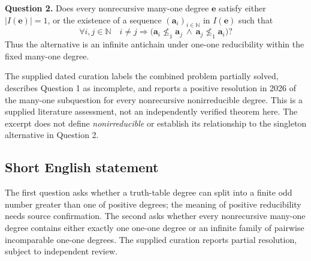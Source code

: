 \documentclass[11pt]{article}
\newcommand{\N}{\mathbb{N}}
\begin{document}
\textbf{Question 2.} Does every nonrecursive many-one degree \(\mathbf e\) satisfy either \(|I(\mathbf e)|=1\), or the existence of a sequence \((\mathbf a_i)_{i\in\N}\) in \(I(\mathbf e)\) such that
\[
\forall i,j\in\N\quad
 i\ne j\Longrightarrow
 \bigl(\mathbf a_i\not\leq_1\mathbf a_j\ \land\ \mathbf a_j\not\leq_1\mathbf a_i\bigr)?
\]
Thus the alternative is an infinite antichain under one-one reducibility within the fixed many-one degree.

The supplied dated curation labels the combined problem partially solved, describes Question 1 as incomplete, and reports a positive resolution in 2026 of the many-one subquestion for every nonrecursive nonirreducible degree. This is a supplied literature assessment, not an independently verified theorem here. The excerpt does not define \emph{nonirreducible} or establish its relationship to the singleton alternative in Question 2.
\subsection{Short English statement}
The first question asks whether a truth-table degree can split into a finite odd number greater than one of positive degrees; the meaning of positive reducibility needs source confirmation. The second asks whether every nonrecursive many-one degree contains either exactly one one-one degree or an infinite family of pairwise incomparable one-one degrees. The supplied curation reports partial resolution, subject to independent review.
\end{document}
